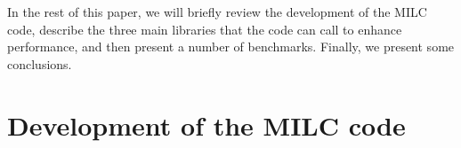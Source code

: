 \documentclass[epj]{webofc}
\begin{document}
In the rest of this paper, we will briefly review the development of 
the MILC code, describe the three main libraries that the code can call to
enhance performance, and then present a number of benchmarks.  Finally, we
present some conclusions.




\section{Development of the MILC code}\label{sec-1}
\end{document}
